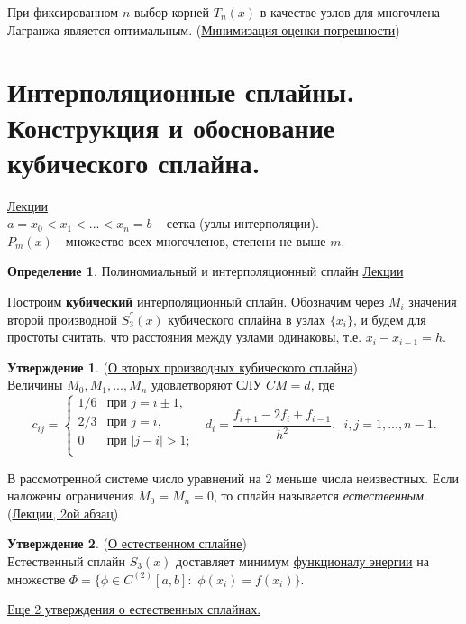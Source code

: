 \documentclass[specialist, subf, href, colorlinks=true, 12pt, times, mtpro, final]{disser}
\theoremstyle{definition}
\newtheorem{defn}{Определение}[section]
\newtheorem{state}{Утверждение}[section]
\begin{document}
    При фиксированном $n$ выбор корней $T_n(x)$ в качестве узлов для многочлена Лагранжа является оптимальным.
    (\hyperlink {lects.20}{Минимизация оценки погрешности})

    

\section {Интерполяционные сплайны. Конструкция и обоснование кубического сплайна.}
    \hyperlink {lects.22}{Лекции}\\
    $a = x_0 < x_1 < ... < x_n = b$ -- сетка (узлы интерполяции).\\
    $P_m(x)$ - множество всех многочленов, степени не выше $m$.
    \begin{defn}
        Полиномиальный и интерполяционный сплайн \hyperlink {lects.22}{Лекции}
    \end{defn}
    Построим {\bf кубический} интерполяционный сплайн. Обозначим через $M_i$ значения
    второй производной $S_3^{''}(x)$ кубического сплайна в узлах $\{x_i\}$, и будем для
    простоты считать, что расстояния между узлами одинаковы, т.е. $x_i - x_{i-1} = h$.
    \begin{state} (\hyperlink {lects.22}{О вторых производных кубического сплайна})\\
    Величины $M_0, M_1, ..., M_n$ удовлетворяют СЛУ $CM=d$, где
    $$
    c_{ij} =
    \begin{cases}
    1/6 &\text{при } j=i\pm 1,\\
    2/3 &\text{при } j=i,\\
    0   &\text{при } |j-i|>1;\\
    \end{cases}
    \,\,\,\, d_i = \frac{f_{i+1}-2f_i+f_{i-1}}{h^2},\,\,\, i,j = 1,...,n-1.
    $$
    \end{state}
    В рассмотренной системе число уравнений на 2 меньше числа неизвестных. Если наложены
    ограничения $M_0 = M_n = 0$, то сплайн называется {\it естественным}.
    (\hyperlink {lects.23}{Лекции, 2ой абзац})
    \begin{state} (\hyperlink {lects.23}{О естественном сплайне})\\
    Естественный сплайн $S_3(x)$ доставляет минимум
    \hyperlink {lects.23}{функционалу энергии} на множестве
    $\Phi = \{\phi\in C^{(2)}[a,b]:\,\,\phi(x_i)=f(x_i)\}$.
    \end{state}
    \noindent \hyperlink{lects.24}{Еще 2 утверждения о естественных сплайнах.}
\end{document}
